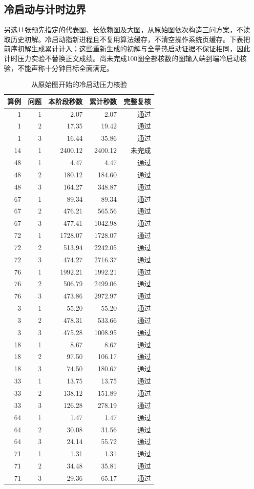 \subsection{冷启动与计时边界}
另选11张预先指定的代表图、长依赖图及大图，从原始图依次构造三问方案，不读取历史初解。冷启动指新进程且不复用算法缓存，不清空操作系统页缓存。下表把前序初解生成累计计入；这些重新生成的初解与全量热启动证据不保证相同，因此计时压力实验不替换正文成绩。尚未完成100图全部核数的图输入端到端冷启动核验，不能声称十分钟目标全面满足。
\begin{table}[!htbp]\centering\small
\caption{从原始图开始的冷启动压力核验}\label{tab:cold-time}
\begin{tabular}{rrrrr}
\toprule
算例 & 问题 & 本阶段秒数 & 累计秒数 & 完整复核\\
\midrule
1 & 1 & 2.07 & 2.07 & 通过\\
1 & 2 & 17.35 & 19.42 & 通过\\
1 & 3 & 16.44 & 35.86 & 通过\\
14 & 1 & 2400.12 & 2400.12 & 未完成\\
48 & 1 & 4.47 & 4.47 & 通过\\
48 & 2 & 180.12 & 184.60 & 通过\\
48 & 3 & 164.27 & 348.87 & 通过\\
67 & 1 & 89.34 & 89.34 & 通过\\
67 & 2 & 476.21 & 565.56 & 通过\\
67 & 3 & 477.41 & 1042.98 & 通过\\
72 & 1 & 1728.07 & 1728.07 & 通过\\
72 & 2 & 513.94 & 2242.05 & 通过\\
72 & 3 & 474.27 & 2716.37 & 通过\\
76 & 1 & 1992.21 & 1992.21 & 通过\\
76 & 2 & 506.79 & 2499.06 & 通过\\
76 & 3 & 473.86 & 2972.97 & 通过\\
3 & 1 & 55.20 & 55.20 & 通过\\
3 & 2 & 478.31 & 533.66 & 通过\\
3 & 3 & 475.28 & 1008.95 & 通过\\
18 & 1 & 8.67 & 8.67 & 通过\\
18 & 2 & 97.50 & 106.17 & 通过\\
18 & 3 & 74.50 & 180.67 & 通过\\
33 & 1 & 13.75 & 13.75 & 通过\\
33 & 2 & 138.12 & 151.89 & 通过\\
33 & 3 & 126.28 & 278.19 & 通过\\
64 & 1 & 1.47 & 1.47 & 通过\\
64 & 2 & 30.08 & 31.56 & 通过\\
64 & 3 & 24.14 & 55.72 & 通过\\
71 & 1 & 1.31 & 1.31 & 通过\\
71 & 2 & 34.48 & 35.81 & 通过\\
71 & 3 & 29.36 & 65.17 & 通过\\
\bottomrule
\end{tabular}
\end{table}

